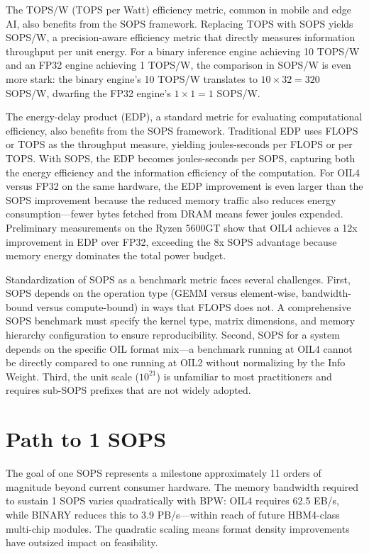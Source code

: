 The TOPS/W (TOPS per Watt) efficiency metric, common in mobile and edge AI, also benefits from the SOPS framework. Replacing TOPS with SOPS yields SOPS/W, a precision-aware efficiency metric that directly measures information throughput per unit energy. For a binary inference engine achieving 10 TOPS/W and an FP32 engine achieving 1 TOPS/W, the comparison in SOPS/W is even more stark: the binary engine's 10 TOPS/W translates to $10 \times 32 = 320$ SOPS/W, dwarfing the FP32 engine's $1 \times 1 = 1$ SOPS/W.

The energy-delay product (EDP), a standard metric for evaluating computational efficiency, also benefits from the SOPS framework. Traditional EDP uses FLOPS or TOPS as the throughput measure, yielding joules-seconds per FLOPS or per TOPS. With SOPS, the EDP becomes joules-seconds per SOPS, capturing both the energy efficiency and the information efficiency of the computation. For OIL4 versus FP32 on the same hardware, the EDP improvement is even larger than the SOPS improvement because the reduced memory traffic also reduces energy consumption---fewer bytes fetched from DRAM means fewer joules expended. Preliminary measurements on the Ryzen 5600GT show that OIL4 achieves a 12x improvement in EDP over FP32, exceeding the 8x SOPS advantage because memory energy dominates the total power budget.

Standardization of SOPS as a benchmark metric faces several challenges. First, SOPS depends on the operation type (GEMM versus element-wise, bandwidth-bound versus compute-bound) in ways that FLOPS does not. A comprehensive SOPS benchmark must specify the kernel type, matrix dimensions, and memory hierarchy configuration to ensure reproducibility. Second, SOPS for a system depends on the specific OIL format mix---a benchmark running at OIL4 cannot be directly compared to one running at OIL2 without normalizing by the Info Weight. Third, the unit scale ($10^{21}$) is unfamiliar to most practitioners and requires sub-SOPS prefixes that are not widely adopted.

\section{Path to 1 SOPS}
\label{sec:path_to_sops}

The goal of one SOPS represents a milestone approximately 11 orders of magnitude beyond current consumer hardware. The memory bandwidth required to sustain 1 SOPS varies quadratically with BPW: OIL4 requires 62.5 EB/s, while BINARY reduces this to 3.9 PB/s---within reach of future HBM4-class multi-chip modules. The quadratic scaling means format density improvements have outsized impact on feasibility.

